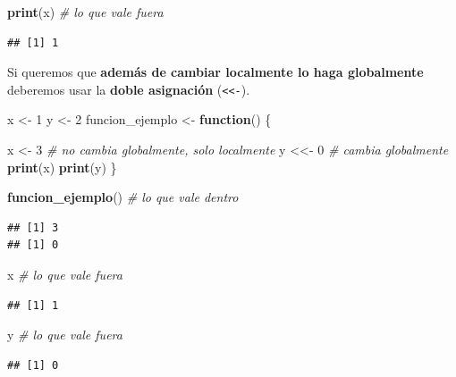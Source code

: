 \documentclass[11pt,]{book}
\newenvironment{Shaded}{\begin{snugshade}}{\end{snugshade}}
\newcommand{\CommentTok}[1]{\textcolor[rgb]{0.37,0.37,0.37}{\textit{#1}}}
\newcommand{\ControlFlowTok}[1]{\textcolor[rgb]{0.27,0.27,0.27}{\textbf{#1}}}
\newcommand{\DecValTok}[1]{\textcolor[rgb]{0.06,0.06,0.06}{#1}}
\newcommand{\KeywordTok}[1]{\textcolor[rgb]{0.27,0.27,0.27}{\textbf{#1}}}
\newcommand{\NormalTok}[1]{#1}
\newcommand{\StringTok}[1]{\textcolor[rgb]{0.5,0.5,0.5}{#1}}
\begin{document}
\begin{Shaded}
\begin{Highlighting}[]
\KeywordTok{print}\NormalTok{(x) }\CommentTok{# lo que vale fuera}
\end{Highlighting}
\end{Shaded}

\begin{verbatim}
## [1] 1
\end{verbatim}

Si queremos que \textbf{además de cambiar localmente lo haga globalmente} deberemos usar la \textbf{doble asignación} (\texttt{\textless{}\textless{}-}).

\begin{Shaded}
\begin{Highlighting}[]
\NormalTok{x <-}\StringTok{ }\DecValTok{1}
\NormalTok{y <-}\StringTok{ }\DecValTok{2}
\NormalTok{funcion_ejemplo <-}\StringTok{ }\ControlFlowTok{function}\NormalTok{() \{}
  
\NormalTok{  x <-}\StringTok{ }\DecValTok{3} \CommentTok{# no cambia globalmente, solo localmente}
\NormalTok{  y <<-}\StringTok{ }\DecValTok{0} \CommentTok{# cambia globalmente}
  \KeywordTok{print}\NormalTok{(x)}
  \KeywordTok{print}\NormalTok{(y)}
\NormalTok{\}}

\KeywordTok{funcion_ejemplo}\NormalTok{() }\CommentTok{# lo que vale dentro}
\end{Highlighting}
\end{Shaded}

\begin{verbatim}
## [1] 3
## [1] 0
\end{verbatim}

\begin{Shaded}
\begin{Highlighting}[]
\NormalTok{x }\CommentTok{# lo que vale fuera}
\end{Highlighting}
\end{Shaded}

\begin{verbatim}
## [1] 1
\end{verbatim}

\begin{Shaded}
\begin{Highlighting}[]
\NormalTok{y }\CommentTok{# lo que vale fuera}
\end{Highlighting}
\end{Shaded}

\begin{verbatim}
## [1] 0
\end{verbatim}
\end{document}
